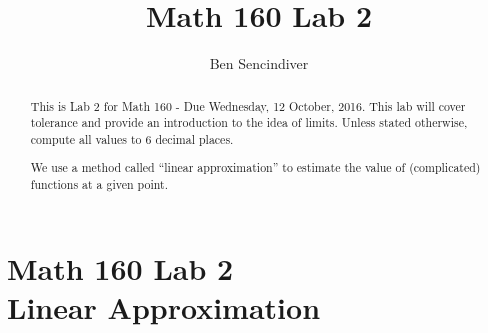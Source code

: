 \documentclass[handout,nooutcomes]{ximera}
\title{Math 160 Lab 2}
\author{Ben Sencindiver} %
\begin{document}
\section{Math 160 Lab 2 \\ Linear Approximation}

\begin{abstract}
This is Lab 2 for Math 160 - Due Wednesday, 12 October, 2016. This lab will cover tolerance and provide an introduction to the idea of limits. Unless stated otherwise, compute all values to $6$ decimal places.

We use a method called ``linear approximation'' to estimate the value of (complicated) functions at a given point.
\end{abstract}

\maketitle
\end{document}
